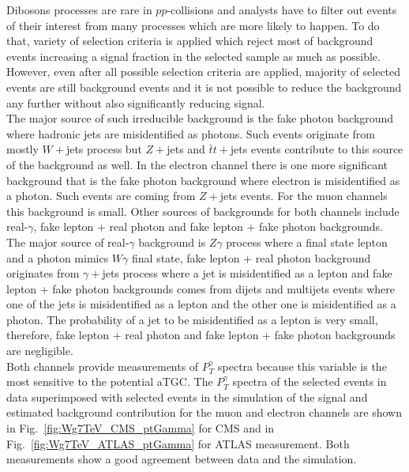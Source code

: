 
Dibosons processes are rare in $pp$-collisions and analysts have to filter out events of their interest from many processes which are more likely to happen. To do that, variety of selection criteria is applied which reject most of background events increasing a signal fraction in the selected sample as much as possible. However, even after all possible selection criteria are applied, majority of selected events are still background events and it is not possible to reduce the background any further without also significantly reducing signal.\\

The major source of such irreducible background is the fake photon background where hadronic jets are misidentified as photons. Such events originate from mostly $W+$jets process but $Z+$jets and $\bar{t}t+$jets events contribute to this source of the background as well. In the electron channel there is one more significant background that is the fake photon background where electron is misidentified as a photon.  Such events are coming from $Z+$jets events. For the muon channels this background is small. Other sources of backgrounds for both channels include real-$\gamma$, fake lepton + real photon and fake lepton + fake photon backgrounds. The major source of real-$\gamma$ background is $Z\gamma$ process where a final state lepton and a photon mimics $W\gamma$ final state, fake lepton + real photon background originates from $\gamma+$jets process where a jet is misidentified as a lepton and fake lepton + fake photon backgrounds comes from dijets and multijets events where one of the jets is misidentified as a lepton and the other one is misidentified as a photon. The probability of a jet to be misidentified as a lepton is very small, therefore, fake lepton + real photon and fake lepton + fake photon backgrounds are negligible.\\

Both channels provide measurements of $P_T^\gamma$ spectra because this variable is the most sensitive to the potential aTGC. The $P_T^\gamma$ spectra of the selected events in data superimposed with selected events in the simulation of the signal and estimated background contribution for the muon and electron channels are shown in Fig.~\ref{fig:Wg7TeV_CMS_ptGamma} for CMS and in Fig.~\ref{fig:Wg7TeV_ATLAS_ptGamma} for ATLAS measurement. Both measurements show a good agreement between data and the simulation.\\

